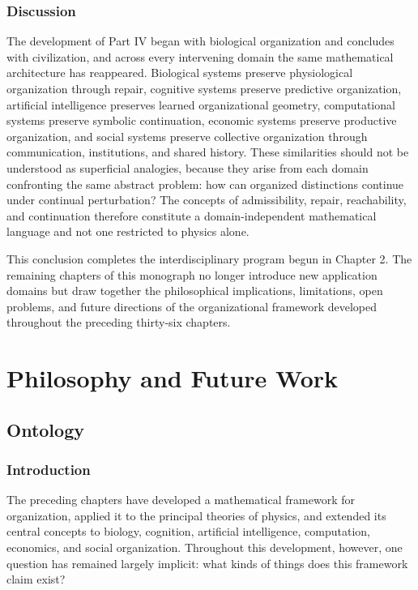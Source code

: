 \documentclass[11pt,oneside]{book}
\numberwithin{equation}{chapter}
\theoremstyle{definition}
\theoremstyle{plain}
\begin{document}
\section{Discussion}

The development of Part IV began with biological organization and concludes with civilization, and across every intervening domain the same mathematical architecture has reappeared. Biological systems preserve physiological organization through repair, cognitive systems preserve predictive organization, artificial intelligence preserves learned organizational geometry, computational systems preserve symbolic continuation, economic systems preserve productive organization, and social systems preserve collective organization through communication, institutions, and shared history. These similarities should not be understood as superficial analogies, because they arise from each domain confronting the same abstract problem: how can organized distinctions continue under continual perturbation? The concepts of admissibility, repair, reachability, and continuation therefore constitute a domain-independent mathematical language and not one restricted to physics alone.

This conclusion completes the interdisciplinary program begun in Chapter 2. The remaining chapters of this monograph no longer introduce new application domains but draw together the philosophical implications, limitations, open problems, and future directions of the organizational framework developed throughout the preceding thirty-six chapters.

\part{Philosophy and Future Work}

\chapter{Ontology}

\section{Introduction}

The preceding chapters have developed a mathematical framework for organization, applied it to the principal theories of physics, and extended its central concepts to biology, cognition, artificial intelligence, computation, economics, and social organization. Throughout this development, however, one question has remained largely implicit: what kinds of things does this framework claim exist?
\end{document}
